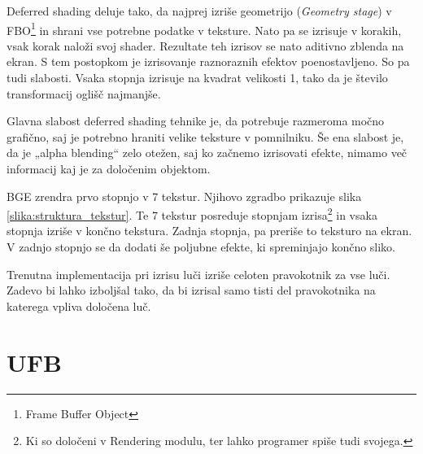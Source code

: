 \documentclass[a4paper]{article}
\begin{document}
Deferred shading deluje tako, da najprej izriše geometrijo (\emph{Geometry stage}) v FBO\footnote{Frame Buffer Object} in shrani vse potrebne podatke v teksture. Nato pa se izrisuje v korakih, vsak korak naloži svoj shader. Rezultate teh izrisov se nato aditivno zblenda na ekran. S tem postopkom je izrisovanje raznoraznih efektov poenostavljeno. So pa tudi slabosti. Vsaka stopnja izrisuje na kvadrat velikosti 1, tako da je število transformacij oglišč najmanjše.

Glavna slabost deferred shading tehnike je, da potrebuje razmeroma močno grafično, saj je potrebno hraniti velike teksture v pomnilniku. Še ena slabost je, da je „alpha blending“ zelo otežen, saj ko začnemo izrisovati efekte, nimamo več informacij kaj je za določenim objektom.

BGE zrendra prvo stopnjo v 7 tekstur. Njihovo zgradbo prikazuje slika \ref{slika:struktura_tekstur}. Te 7 tekstur posreduje stopnjam izrisa\footnote{Ki so določeni v Rendering modulu, ter lahko programer spiše tudi svojega.} in vsaka stopnja izriše v končno tekstura. Zadnja stopnja, pa preriše to teksturo na ekran. V zadnjo stopnjo se da dodati še poljubne efekte, ki spreminjajo končno sliko.

Trenutna implementacija pri izrisu luči izriše celoten pravokotnik za vse luči. Zadevo bi lahko izboljšal tako, da bi izrisal samo tisti del pravokotnika na katerega vpliva določena luč.

\section{UFB}
\end{document}

